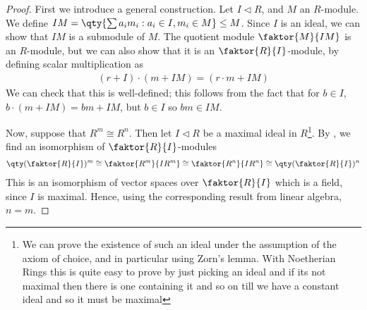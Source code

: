 \begin{proof}
	First we introduce a general construction.
	Let $I \triangleleft R$, and $M$ an $R$-module.
	We define $IM = \qty{\sum a_i m_i : a_i \in I, m_i \in M} \leq M$.
	Since $I$ is an ideal, we can show that $IM$ is a submodule of $M$.
	The quotient module $\faktor{M}{IM}$ is an $R$-module, but we can also show that it is an $\faktor{R}{I}$-module, by defining scalar multiplication as
	\begin{align*}
		(r+I) \cdot (m+IM) = (r \cdot m + IM)
	\end{align*}
	We can check that this is well-defined; this follows from the fact that for $b \in I$, $b \cdot (m + IM) = bm + IM$, but $b \in I$ so $bm \in IM$.

	Now, suppose that $R^m \cong R^n$.
	Then let $I \triangleleft R$ be a maximal ideal in $R$\footnote{We can prove the existence of such an ideal under the assumption of the axiom of choice, and in particular using Zorn's lemma. With Noetherian Rings this is quite easy to prove by just picking an ideal and if its not maximal then there is one containing it and so on till we have a constant ideal and so it must be maximal}.
	By , we find an isomorphism of $\faktor{R}{I}$-modules
	\begin{align*}
		\qty(\faktor{R}{I})^m \cong \faktor{R^m}{IR^m} \cong \faktor{R^n}{IR^n} \cong \qty(\faktor{R}{I})^n
	\end{align*}
	This is an isomorphism of vector spaces over $\faktor{R}{I}$ which is a field, since $I$ is maximal.
	Hence, using the corresponding result from linear algebra, $n = m$.
\end{proof}